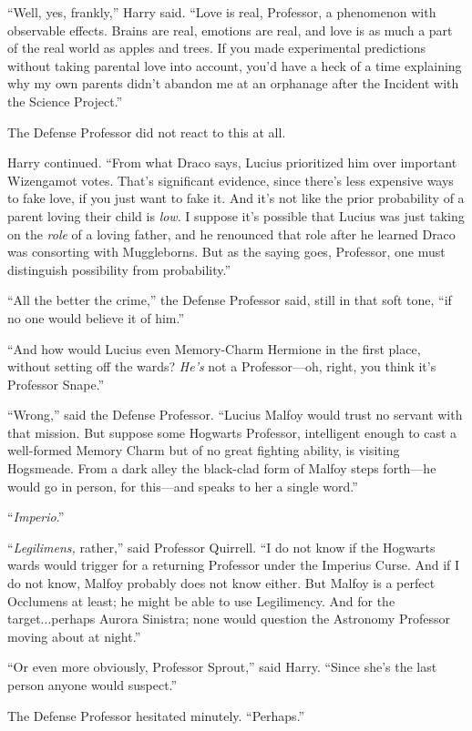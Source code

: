 “Well, yes, frankly,” Harry said. “Love is real, Professor, a phenomenon with observable effects. Brains are real, emotions are real, and love is as much a part of the real world as apples and trees. If you made experimental predictions without taking parental love into account, you’d have a heck of a time explaining why my own parents didn’t abandon me at an orphanage after the Incident with the Science Project.”

The Defense Professor did not react to this at all.

Harry continued. “From what Draco says, Lucius prioritized him over important Wizengamot votes. That’s significant evidence, since there’s less expensive ways to fake love, if you just want to fake it. And it’s not like the prior probability of a parent loving their child is \emph{low}. I suppose it’s possible that Lucius was just taking on the \emph{role} of a loving father, and he renounced that role after he learned Draco was consorting with Muggleborns. But as the saying goes, Professor, one must distinguish possibility from probability.”

“All the better the crime,” the Defense Professor said, still in that soft tone, “if no one would believe it of him.”

“And how would Lucius even Memory-Charm Hermione in the first place, without setting off the wards? \emph{He’s} not a Professor—oh, right, you think it’s Professor Snape.”

“Wrong,” said the Defense Professor. “Lucius Malfoy would trust no servant with that mission. But suppose some Hogwarts Professor, intelligent enough to cast a well-formed Memory Charm but of no great fighting ability, is visiting Hogsmeade. From a dark alley the black-clad form of Malfoy steps forth—he would go in person, for this—and speaks to her a single word.”

“\emph{Imperio}.”

“\emph{Legilimens,} rather,” said Professor Quirrell. “I do not know if the Hogwarts wards would trigger for a returning Professor under the Imperius Curse. And if I do not know, Malfoy probably does not know either. But Malfoy is a perfect Occlumens at least; he might be able to use Legilimency. And for the target...perhaps Aurora Sinistra; none would question the Astronomy Professor moving about at night.”

“Or even more obviously, Professor Sprout,” said Harry. “Since she’s the last person anyone would suspect.”

The Defense Professor hesitated minutely. “Perhaps.”

